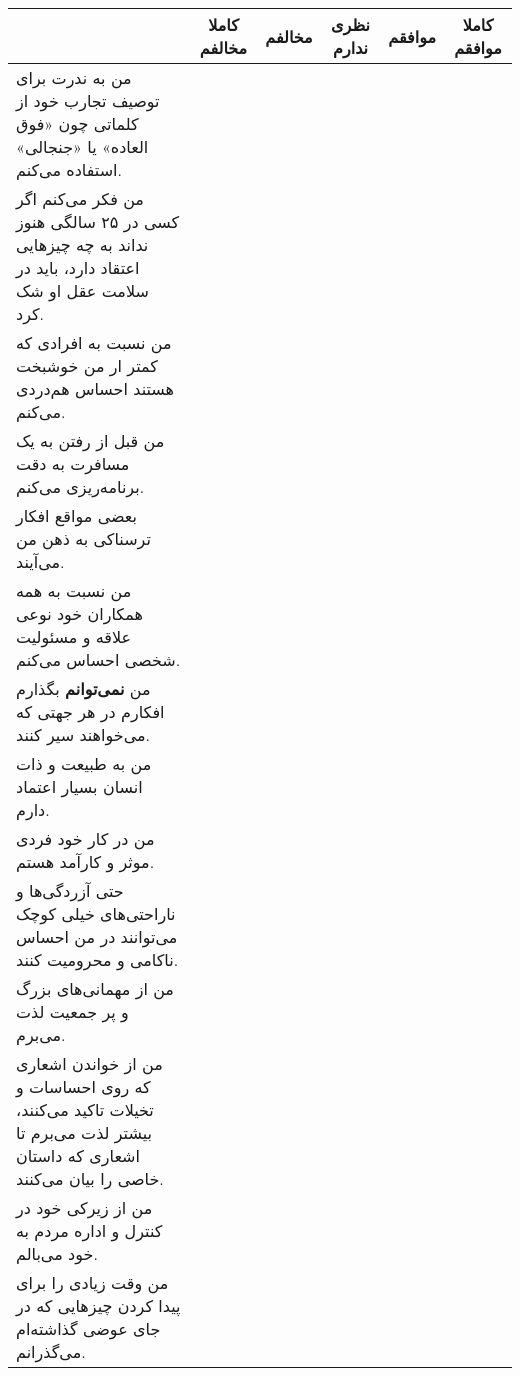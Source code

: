 \documentclass[a4paper,10pt]{article}
\begin{document}
\begin{center}
\begin{tabular}{|p{6cm}|c|c|c|c|c|}
\hline
 & کاملا مخالفم & مخالفم & نظری ندارم & موافقم & کاملا موافقم\\
\hline





من به ندرت برای توصیف تجارب خود از کلماتی چون «فوق العاده» یا «جنجالی» استفاده می‌کنم.& & & & & \\
\hline


من فکر می‌کنم اگر کسی در ۲۵ سالگی هنوز نداند به چه چیزهایی اعتقاد دارد، باید در سلامت عقل او شک کرد.& & & & & \\
\hline


من نسبت به افرادی که کمتر ار من خوشبخت هستند احساس هم‌دردی می‌کنم.& & & & & \\
\hline


من قبل از رفتن به یک مسافرت به دقت برنامه‌ریزی می‌کنم.& & & & & \\
\hline


بعضی مواقع افکار ترسناکی به ذهن من می‌آیند.& & & & & \\
\hline

من نسبت به همه همکاران خود نوعی علاقه و مسئولیت شخصی احساس می‌کنم.& & & & & \\
\hline


من \textbf{نمی‌توانم} بگذارم افکارم در هر جهتی که می‌خواهند سیر کنند.& & & & & \\
\hline


من به طبیعت و ذات انسان بسیار اعتماد دارم.& & & & & \\
\hline


من در کار خود فردی موثر و کارآمد هستم.& & & & & \\
\hline


حتی آزردگی‌ها و ناراحتی‌های خیلی کوچک می‌توانند در من احساس ناکامی و محرومیت کنند.& & & & & \\
\hline


من از مهمانی‌های بزرگ و پر جمعیت لذت می‌برم.& & & & & \\
\hline


من از خواندن اشعاری که روی احساسات و تخیلات تاکید می‌کنند، بیشتر لذت می‌برم تا اشعاری که داستان خاصی را بیان می‌کنند.& & & & & \\
\hline


من از زیرکی خود در کنترل و اداره مردم به خود می‌بالم.& & & & & \\
\hline


من وقت زیادی را برای پیدا کردن چیزهایی که در جای عوضی گذاشته‌ام می‌گذرانم.& & & & & \\
\hline



\end{tabular}
\end{center}
\end{document}

